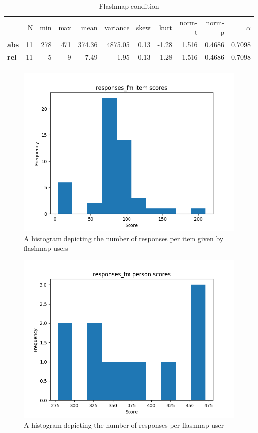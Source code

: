 \begin{longtable}[c]{@{}lrrrrrrrrrr@{}}
\caption{Flashmap condition}
\endfirsthead
\toprule\addlinespace
& N & min & max & mean & variance & skew & kurt & norm-t &
norm-p & $\alpha$
\\\addlinespace
\midrule
\textbf{abs} & 11 & 278 & 471 & 374.36 & 4875.05 & 0.13 & -1.28 & 1.516
& 0.4686 & 0.7098
\\\addlinespace
\textbf{rel} & 11 & 5 & 9 & 7.49 & 1.95 & 0.13 & -1.28 & 1.516 & 0.4686
& 0.7098
\\\addlinespace
\bottomrule
    \label{tab:responses_fm}
\end{longtable}

\begin{figure}
    \centering
\includegraphics[width=.7\textwidth]{img/responses_fm_diff.png}
    \caption{A histogram depicting the number of responses per item given by flashmap users}
    \label{fig:responses_fm_diff}
\end{figure}
\begin{figure}
    \centering
    \includegraphics[width=.7\textwidth]{img/responses_fm_abil.png}
    \caption{A histogram depicting the number of responses per flashmap user}
    \label{fig:responses_fm_abil}
\end{figure}

